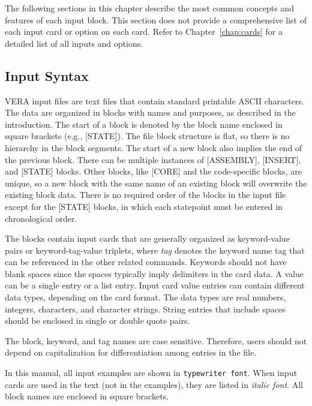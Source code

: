 \documentclass{vera-ornltm}
\begin{document}
The following sections in this chapter describe the most common concepts and features of each input block.
This section does not provide a comprehensive list of each input card or option on each card.
Refer to Chapter~\ref{chap:cards} for a detailed list of all inputs and options.

\subsection{Input Syntax}
\label{sec:inputsyntax}

VERA input files are text files that contain standard printable ASCII characters.
The data are organized in blocks with names and purposes, as described in the
introduction. The start of a block is denoted by the block name enclosed in
square brackets (e.g., [STATE]). The file block structure is flat, so there is
no hierarchy in the block segments. The start of a new block also implies the end of
the previous block. There can be multiple instances of [ASSEMBLY], [INSERT], and [STATE] blocks.
Other blocks, like [CORE] and the code-specific blocks, are unique, so a new
block with the same name of an existing block will overwrite the existing block data.
There is no required order of the blocks in the input file except for the [STATE] blocks,
in which each statepoint must be entered in chronological order.

The blocks contain input cards that are generally organized as keyword-value pairs
or keyword-tag-value triplets, where \textit{tag} denotes the keyword name tag that can be
referenced in the other related commands. Keywords should not have blank spaces
since the spaces typically imply delimiters in the card data.  A value can be a single entry
or a list entry.
Input card value entries can contain different data types, depending on the card format.
The data types are real numbers, integers, characters, and character strings.
String entries that include spaces should be enclosed in
single or double quote pairs.

The block, keyword, and tag names are case sensitive. Therefore, users should not depend on capitalization for differentiation among
entries in the file.

In this manual, all input examples are shown in {\tt typewriter font}.
When input cards are used in the text (not in the examples), they are listed in {\it italic font}.
All block names are enclosed in square brackets.
\end{document}
